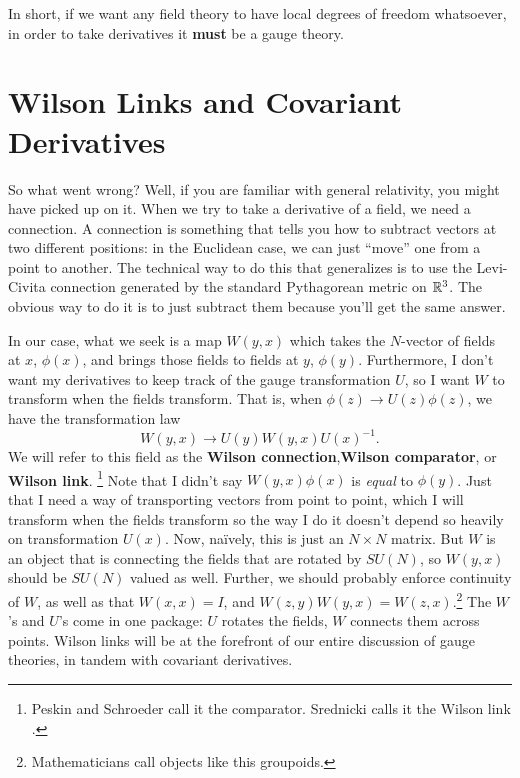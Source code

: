 \documentclass[main.tex]{subfiles}
\begin{document}
In short, if we want any field theory to have local degrees of freedom whatsoever, in order to take derivatives it \textbf{must} be a gauge theory.

\section{Wilson Links and Covariant Derivatives}
So what went wrong? Well, if you are familiar with general relativity, you might have picked up on it. When we try to take a derivative of a field, we need a connection. A connection is something that tells you how to subtract vectors at two different positions: in the Euclidean case, we can just ``move'' one from a point to another. The technical way to do this that generalizes is to use the Levi-Civita connection generated by the standard Pythagorean metric on $\mathbb{R}^3$. The obvious way to do it is to just subtract them because you'll get the same answer. 

In our case, what we seek is a map $W(y,x)$ which takes the $N$-vector of fields at $x$, $\phi(x)$, and brings those fields to fields at $y$, $\phi(y)$. Furthermore, I don't want my derivatives to keep track of the gauge transformation $U$, so I want $W$ to transform when the fields transform. That is, when $\phi (z) \to U(z) \phi(z)$, we have the transformation law
\[
W(y,x) \to U(y) W(y,x) U(x)^{-1}.
\]
We will refer to this field as the \textbf{Wilson connection},\textbf{Wilson comparator}, or \textbf{Wilson link}. \footnote{Peskin and Schroeder call it the comparator. \cite{pas} Srednicki calls it the Wilson link \cite{sred}.} Note that I didn't say $W(y,x) \phi(x)$ is \textit{equal} to $\phi(y)$. Just that I need a way of transporting vectors from point to point, which I will transform when the fields transform so the way I do it doesn't depend so heavily on transformation $U(x)$. Now, na\"ively, this is just an $N \times N$ matrix. But $W$ is an object that is connecting the fields that are rotated by $SU(N)$, so $W(y,x)$ should be $SU(N)$ valued as well. Further, we should probably enforce continuity of $W$, as well as that $W(x,x) = I$, and $W(z,y) W(y,x) = W(z,x)$.\footnote{Mathematicians call objects like this groupoids.} The $W$'s and $U$'s come in one package: $U$ rotates the fields, $W$ connects them across points. Wilson links will be at the forefront of our entire discussion of gauge theories, in tandem with covariant derivatives. 
\end{document}
